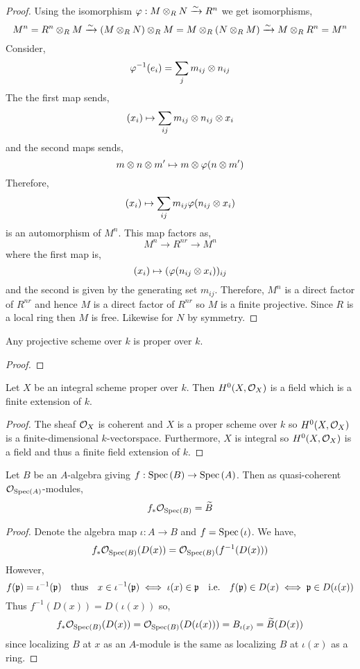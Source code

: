 \documentclass[12pt]{article}
\begin{document}
\begin{proof}
Using the isomorphism $\varphi : M \otimes_R N \xrightarrow{\sim} R^n$ we get isomorphisms,
\[ M^n = R^n \otimes_R M \xrightarrow{\sim} (M \otimes_R N) \otimes_R M = M \otimes_R (N \otimes_R M) \xrightarrow{\sim} M \otimes_R R^n = M^n \]
Consider,
\[ \varphi^{-1}(e_i) = \sum_j m_{ij} \otimes n_{ij} \]
The the first map sends,
\[ (x_i) \mapsto \sum_{ij} m_{ij} \otimes n_{ij} \otimes x_i \]
and the second maps sends,
\[ m \otimes n \otimes m' \mapsto m \otimes \varphi(n \otimes m') \]
Therefore, 
\[ (x_i) \mapsto \sum_{ij} m_{ij} \varphi(n_{ij} \otimes x_i) \]
is an automorphism of $M^n$. This map factors as,
\[ M^n \to R^{nr} \to M^n \]
where the first map is,
\[ (x_i) \mapsto (\varphi(n_{ij} \otimes x_i))_{ij} \]
and the second is given by the generating set $m_{ij}$. Therefore, $M^n$ is a direct factor of $R^{nr}$ and hence $M$ is a direct factor of $R^{nr}$ so $M$ is a finite projective. Since $R$ is a local ring then $M$ is free. Likewise for $N$ by symmetry. 
\end{proof}

\begin{lemma} \label{projective_scheme_proper}
Any projective scheme over $k$ is proper over $k$.
\end{lemma}

\begin{proof}

\end{proof}

\begin{lemma} \label{global_sections_proper_scheme}
Let $X$ be an integral scheme proper over $k$. Then $H^0(X, \mathcal{O}_{X})$ is a field which is a finite extension of $k$. 
\end{lemma}

\begin{proof}
The sheaf $\mathcal{O}_{X}$ is coherent and $X$ is a proper scheme over $k$ so $H^0(X, \mathcal{O}_{X})$ is a finite-dimensional $k$-vectorspace. Furthermore, $X$ is integral so $H^0(X, \mathcal{O}_{X})$ is a field and thus a finite field extension of $k$.
\end{proof}

\begin{lemma}
Let $B$ be an $A$-algebra giving $f : \mathrm{Spec}\left( B \right) \to \mathrm{Spec}\left( A \right)$. Then as quasi-coherent $\mathcal{O}_{\mathrm{Spec}\left( A \right)}$-modules,
 \[ f_* \mathcal{O}_{\mathrm{Spec}\left( B \right)} = \widetilde{B} \]
\end{lemma}

\begin{proof}
Denote the algebra map $\iota : A \to B$ and $f = \mathrm{Spec}\left( \iota \right)$. We have, 
\[ f_* \mathcal{O}_{\mathrm{Spec}\left( B \right)}(D(x)) = \mathcal{O}_{\mathrm{Spec}\left( B \right)}(f^{-1}(D(x))) \] However, 
\[ f(\mathfrak{p}) = \iota^{-1}(\mathfrak{p}) \quad \text{thus} \quad x \in \iota^{-1}(\mathfrak{p}) \iff \iota(x) \in \mathfrak{p} \quad \text{i.e.} \quad f(\mathfrak{p}) \in D(x) \iff \mathfrak{p} \in D(\iota(x)) \] Thus $f^{-1}(D(x)) = D(\iota(x))$ so,
\[ f_* \mathcal{O}_{\mathrm{Spec}\left( B \right)}(D(x)) = \mathcal{O}_{\mathrm{Spec}\left( B \right)}(D(\iota(x))) = B_{\iota(x)}  = \widetilde{B}(D(x)) \]
since localizing $B$ at $x$ as an $A$-module is the same as localizing $B$ at $\iota(x)$ as a ring.
\end{proof}
\end{document}
